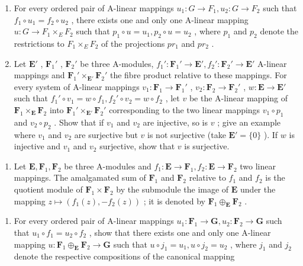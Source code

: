 \begin{enumerate}
\def\labelenumi{(\alph{enumi})}
\item
  For every ordered pair of A-linear mappings \(u_1 \colon G \to F_1, u_2 \colon G \to F_2\) such that \(f_1 \circ u_1 = f_2 \circ u_2\) , there exists one and only one A-linear mapping \(u \colon G \to F_1 \times_E F_2\) such that \(p_1 \circ u = u_1, p_2 \circ u = u_2\) , where \(p_1\) and \(p_2\) denote the restrictions to \(F_1 \times_E F_2\) of the projections \(pr_1\) and \(pr_2\) .
\item
  Let \(\mathbf{E}'\) , \(\mathbf{F}_1'\) , \(\mathbf{F}_2'\) be three A-modules, \(f_1': \mathbf{F}_1' \to \mathbf{E}', f_2': \mathbf{F}_2' \to \mathbf{E}'\) A-linear mappings and \(\mathbf{F}_1' \times_{\mathbf{E}'} \mathbf{F}_2'\) the fibre product relative to these mappings. For every system of A-linear mappings \(v_1: \mathbf{F}_1 \to \mathbf{F}_1'\) , \(v_2: \mathbf{F}_2 \to \mathbf{F}_2'\) , \(w: \mathbf{E} \to \mathbf{E}'\) such that \(f_1' \circ v_1 = w \circ f_1, f_2' \circ v_2 = w \circ f_2\) , let \(v\) be the A-linear mapping of \(\mathbf{F}_1 \times_{\mathbf{E}} \mathbf{F}_2\) into \(\mathbf{F}_1' \times_{\mathbf{E}'} \mathbf{F}_2'\) corresponding to the two linear mappings \(v_1 \circ p_1\) and \(v_2 \circ p_2\) . Show that if \(v_1\) and \(v_2\) are injective, so is \(v\) ; give an example where \(v_1\) and \(v_2\) are surjective but \(v\) is not surjective (take \(\mathbf{E}' = \{0\}\) ). If \(w\) is injective and \(v_1\) and \(v_2\) surjective, show that \(v\) is surjective.
\end{enumerate}

\begin{enumerate}
\def\labelenumi{\arabic{enumi}.}
\setcounter{enumi}{4}
\tightlist
\item
  Let \(\mathbf{E}, \mathbf{F}_1, \mathbf{F}_2\) be three A-modules and \(f_1: \mathbf{E} \to \mathbf{F}_1, f_2: \mathbf{E} \to \mathbf{F}_2\) two linear mappings. The amalgamated sum of \(\mathbf{F}_1\) and \(\mathbf{F}_2\) relative to \(f_1\) and \(f_2\) is the quotient module of \(\mathbf{F}_1 \times \mathbf{F}_2\) by the submodule the image of \(\mathbf{E}\) under the mapping \(z \mapsto (f_1(z), -f_2(z))\) ; it is denoted by \(\mathbf{F}_1 \oplus_{\mathbf{E}} \mathbf{F}_2\) .
\end{enumerate}

\begin{enumerate}
\def\labelenumi{(\alph{enumi})}
\tightlist
\item
  For every ordered pair of A-linear mappings \(u_{1}: \mathbf{F}_{1} \to \mathbf{G}, u_{2}: \mathbf{F}_{2} \to \mathbf{G}\) such that \(u_{1} \circ f_{1} = u_{2} \circ f_{2}\) , show that there exists one and only one A-linear mapping \(u: \mathbf{F}_{1} \oplus_{\mathbf{E}} \mathbf{F}_{2} \to \mathbf{G}\) such that \(u \circ j_{1} = u_{1}, u \circ j_{2} = u_{2}\) , where \(j_{1}\) and \(j_{2}\) denote the respective compositions of the canonical mapping
\end{enumerate}

